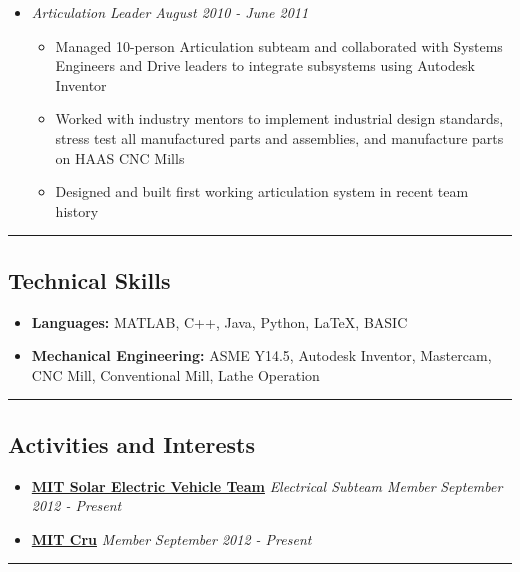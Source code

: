 \documentclass[10pt,letterpaper]{article}
\begin{document}
\begin{itemize}
    \item[]
    {\emph{Articulation Leader} \hfill \emph{August 2010 - June 2011}}

    \begin{itemize}[label=\textbullet]
      \itemsep0em
      \item Managed 10-person Articulation subteam and collaborated with Systems Engineers and Drive leaders to integrate subsystems using Autodesk Inventor
      \item Worked with industry mentors to implement industrial design standards, stress test all manufactured parts and assemblies, and manufacture parts on HAAS CNC Mills
      \item Designed and built first working articulation system in recent team history
    \end{itemize}
  \end{itemize}
  
\hrule
\vspace{-0.4em}

\subsection*{Technical Skills}
\begin{itemize}
	\item[]\textbf{Languages:} MATLAB, C++, Java, Python, \LaTeX, BASIC
	\item[]\textbf{Mechanical Engineering:} ASME Y14.5, Autodesk Inventor, Mastercam, CNC Mill, Conventional Mill, Lathe Operation
\end{itemize}

\hrule
\vspace{-0.4em}
\subsection*{Activities and Interests}
\begin{itemize}
	\item[]{\href{http://solar-cars.scripts.mit.edu/}{\textbf{MIT Solar Electric Vehicle Team}}} \emph{Electrical Subteam Member} \hfill \emph{September 2012 - Present}
	\item[]{\href{https://sites.google.com/site/mitcampuscru/}{\textbf{MIT Cru}}} \emph{Member} \hfill \emph{September 2012 - Present}
\end{itemize}

\hrule
\vspace{-0.4em}
\end{document}
